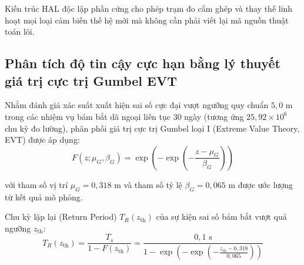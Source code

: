 Kiến trúc HAL độc lập phần cứng cho phép trạm đo cắm ghép và thay thế linh hoạt mọi loại cảm biến thế hệ mới mà không cần phải viết lại mã nguồn thuật toán lõi.

\subsection{Phân tích độ tin cậy cực hạn bằng lý thuyết giá trị cực trị Gumbel EVT}

\hspace{0.5cm} Nhằm đánh giá xác suất xuất hiện sai số cực đại vượt ngưỡng quy chuẩn $5{,}0$ m trong các nhiệm vụ bám bắt dã ngoại liên tục 30 ngày (tương ứng $25{,}92 \times 10^6$ chu kỳ đo lường), phân phối giá trị cực trị Gumbel loại I (Extreme Value Theory, EVT) được áp dụng:
\begin{equation}
F(z; \mu_G, \beta_G) = \exp \left( - \exp \left( - \frac{z - \mu_G}{\beta_G} \right) \right)
\label{eq:gumbel-evt-distribution-formula}
\end{equation}

với tham số vị trí $\mu_G = 0{,}318$ m và tham số tỷ lệ $\beta_G = 0{,}065$ m được ước lượng từ kết quả mô phỏng.

Chu kỳ lặp lại (Return Period) $T_R(z_{\text{th}})$ của sự kiện sai số bám bắt vượt quá ngưỡng $z_{\text{th}}$:
\begin{equation}
T_R(z_{\text{th}}) = \frac{T_s}{1 - F(z_{\text{th}})} = \frac{0{,}1\text{ s}}{1 - \exp \left( - \exp \left( - \frac{z_{\text{th}} - 0{,}318}{0{,}065} \right) \right)}
\label{eq:gumbel-return-period-formula-w15}
\end{equation}

\begin{table}[H]
\centering
\caption{Chu kỳ lặp lại và xác suất an toàn tuyệt đối của các ngưỡng sai số cực hạn}
\label{tab:gumbel-evt-return-periods-table}
\end{table}

